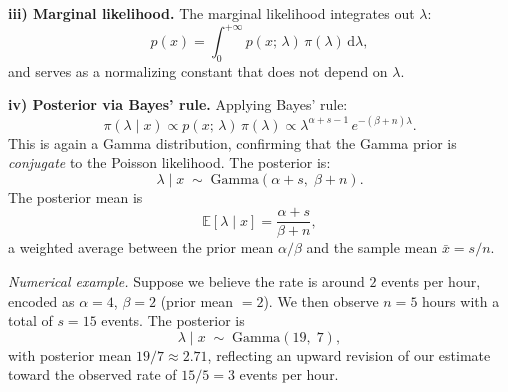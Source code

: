\medskip

\textbf{iii) Marginal likelihood.} The marginal likelihood integrates out $\lambda$:
\[
    p(x) = \int_0^{+\infty} p(x;\,\lambda)\,\pi(\lambda)\,\mathrm{d}\lambda,
\]
and serves as a normalizing constant that does not depend on $\lambda$.

\medskip

\textbf{iv) Posterior via Bayes' rule.} Applying Bayes' rule:
\[
    \pi(\lambda \mid x) \propto p(x;\,\lambda)\,\pi(\lambda) \propto \lambda^{\alpha + s - 1}\,e^{-(\beta+n)\lambda}.
\]
This is again a Gamma distribution, confirming that the Gamma prior is \emph{conjugate} to the Poisson likelihood. The posterior is:
\[
    \lambda \mid x \;\sim\; \mathrm{Gamma}(\alpha + s,\; \beta + n).
\]
The posterior mean is
\[
    \mathbb{E}[\lambda \mid x] = \frac{\alpha + s}{\beta + n},
\]
a weighted average between the prior mean $\alpha/\beta$ and the sample mean $\bar{x} = s/n$.

\medskip

\textit{Numerical example.} Suppose we believe the rate is around $2$ events per hour, encoded as $\alpha = 4$, $\beta = 2$ (prior mean $= 2$). We then observe $n = 5$ hours with a total of $s = 15$ events. The posterior is
\[
    \lambda \mid x \;\sim\; \mathrm{Gamma}(19,\; 7),
\]
with posterior mean $19/7 \approx 2.71$, reflecting an upward revision of our estimate toward the observed rate of $15/5 = 3$ events per hour.
